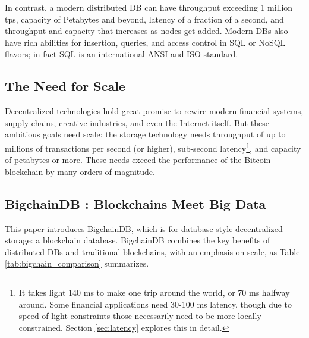 In contrast, a modern distributed DB can have throughput exceeding 1 million tps, capacity of Petabytes and beyond, latency of a fraction of a second, and throughput and capacity that increases as nodes get added.
Modern DBs also have rich abilities for insertion, queries, and access control in SQL or NoSQL flavors; in fact SQL is an international ANSI and ISO standard.

\subsection{The Need for Scale}
Decentralized technologies hold great promise to rewire modern financial systems, supply chains, creative industries, and even the Internet itself.
But these ambitious goals need scale: the storage technology needs throughput of up to millions of transactions per second (or higher), sub-second latency\footnote{It takes light 140 ms to make one trip around the world, or 70 ms halfway around. Some financial applications need 30-100 ms latency, though due to speed-of-light constraints those necessarily need to be more locally constrained. Section \ref{sec:latency} explores this in detail.}, and capacity of petabytes or more.
These needs exceed the performance of the Bitcoin blockchain by many orders of magnitude.

\subsection{BigchainDB : Blockchains Meet Big Data}
This paper introduces BigchainDB, which is for database-style decentralized storage: a blockchain database.
BigchainDB combines the key benefits of distributed DBs and traditional blockchains, with an emphasis on scale, as Table \ref{tab:bigchain_comparison} summarizes.

